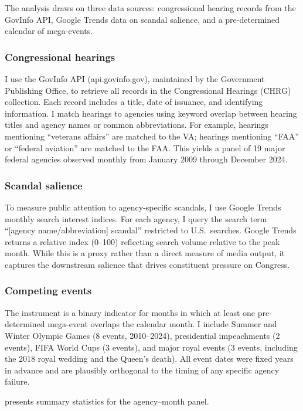 \documentclass[12pt]{article}
\begin{document}
The analysis draws on three data sources: congressional hearing records from the GovInfo API, Google Trends data on scandal salience, and a pre-determined calendar of mega-events.

\subsubsection*{Congressional hearings} I use the GovInfo API (api.govinfo.gov), maintained by the Government Publishing Office, to retrieve all records in the Congressional Hearings (CHRG) collection. Each record includes a title, date of issuance, and identifying information. I match hearings to agencies using keyword overlap between hearing titles and agency names or common abbreviations. For example, hearings mentioning ``veterans affairs'' are matched to the VA; hearings mentioning ``FAA'' or ``federal aviation'' are matched to the FAA. This yields a panel of 19 major federal agencies observed monthly from January 2009 through December 2024.

\subsubsection*{Scandal salience} To measure public attention to agency-specific scandals, I use Google Trends monthly search interest indices. For each agency, I query the search term ``[agency name/abbreviation] scandal'' restricted to U.S.\ searches. Google Trends returns a relative index (0--100) reflecting search volume relative to the peak month. While this is a proxy rather than a direct measure of media output, it captures the downstream salience that drives constituent pressure on Congress.

\subsubsection*{Competing events} The instrument is a binary indicator for months in which at least one pre-determined mega-event overlaps the calendar month. I include Summer and Winter Olympic Games (8 events, 2010--2024), presidential impeachments (2 events), FIFA World Cups (3 events), and major royal events (3 events, including the 2018 royal wedding and the Queen's death). All event dates were fixed years in advance and are plausibly orthogonal to the timing of any specific agency failure.



 presents summary statistics for the agency--month panel.
\end{document}
